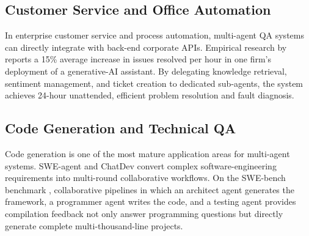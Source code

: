 \subsection{Customer Service and Office Automation}
\label{sec:enterprise}

In enterprise customer service and process automation, multi-agent QA
systems can directly integrate with back-end corporate APIs.
Empirical research by \citet{brynjolfsson2023generative_ai_work}
reports a 15\% average increase in issues resolved per hour in one firm's
deployment of a generative-AI assistant.
By delegating knowledge retrieval, sentiment management, and ticket creation
to dedicated sub-agents, the system achieves 24-hour unattended, efficient
problem resolution and fault diagnosis.

\subsection{Code Generation and Technical QA}
\label{sec:code}

Code generation is one of the most mature application areas for multi-agent
systems.
SWE-agent \citep{yang2024swe_agent} and ChatDev \citep{qian2023chatdev}
convert complex software-engineering requirements into multi-round
collaborative workflows.
On the SWE-bench benchmark \citep{jimenez2024swe_bench}, collaborative
pipelines in which an architect agent generates the framework, a programmer
agent writes the code, and a testing agent provides compilation feedback
not only answer programming questions but directly generate complete
multi-thousand-line projects.
